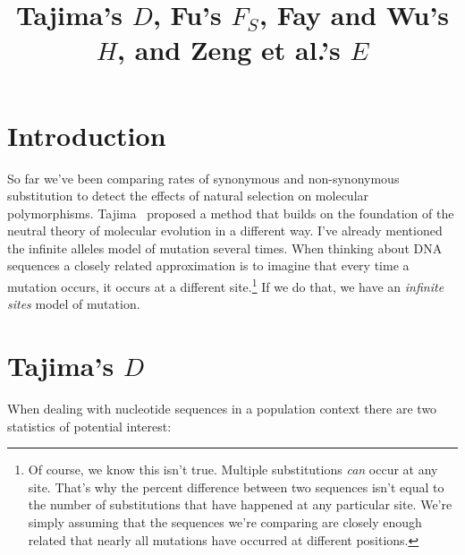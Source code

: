 \documentclass[12pt]{article}
\title{Tajima's $D$, Fu's $F_S$, Fay and Wu's $H$, and Zeng et al.'s $E$}
\begin{document}
\maketitle

\thispagestyle{first}

\section*{Introduction}

So far we've been comparing rates of synonymous and non-synonymous
substitution to detect the effects of natural selection on molecular
polymorphisms. Tajima~\cite{Tajima89} proposed a method that builds on
the foundation of the neutral theory of molecular evolution in a
different way. I've already mentioned the infinite alleles model of
mutation several times. When thinking about DNA sequences a closely
related approximation is to imagine that every time a mutation occurs,
it occurs at a different site.\footnote{Of course, we know this isn't
  true. Multiple substitutions {\it can\/} occur at any site. That's
  why the percent difference between two sequences isn't equal to the
  number of substitutions that have happened at any particular
  site. We're simply assuming that the sequences we're comparing are
  closely enough related that nearly all mutations have occurred at
  different positions.} If we do that, we have an {\it infinite
  sites\/} model of mutation.

\section*{Tajima's $D$}

When dealing with nucleotide sequences in a population context there
are two statistics of potential interest:
\end{document}
